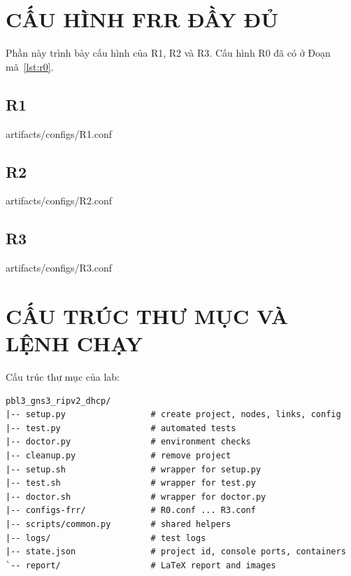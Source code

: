 \documentclass[12pt,a4paper]{article}
\begin{document}
\section{CẤU HÌNH FRR ĐẦY ĐỦ}
\label{app:configs}

Phần này trình bày cấu hình của R1, R2 và R3. Cấu hình R0 đã có ở Đoạn mã~\ref{lst:r0}.

\subsection{R1}


  {artifacts/configs/R1.conf}

\subsection{R2}


  {artifacts/configs/R2.conf}

\subsection{R3}


  {artifacts/configs/R3.conf}

\section{CẤU TRÚC THƯ MỤC VÀ LỆNH CHẠY}
\label{app:usage}

Cấu trúc thư mục của lab:

\begin{lstlisting}[style=plaincode,caption={Cấu trúc thư mục lab.}]
pbl3_gns3_ripv2_dhcp/
|-- setup.py                 # create project, nodes, links, config
|-- test.py                  # automated tests
|-- doctor.py                # environment checks
|-- cleanup.py               # remove project
|-- setup.sh                 # wrapper for setup.py
|-- test.sh                  # wrapper for test.py
|-- doctor.sh                # wrapper for doctor.py
|-- configs-frr/             # R0.conf ... R3.conf
|-- scripts/common.py        # shared helpers
|-- logs/                    # test logs
|-- state.json               # project id, console ports, containers
`-- report/                  # LaTeX report and images
\end{lstlisting}
\end{document}
